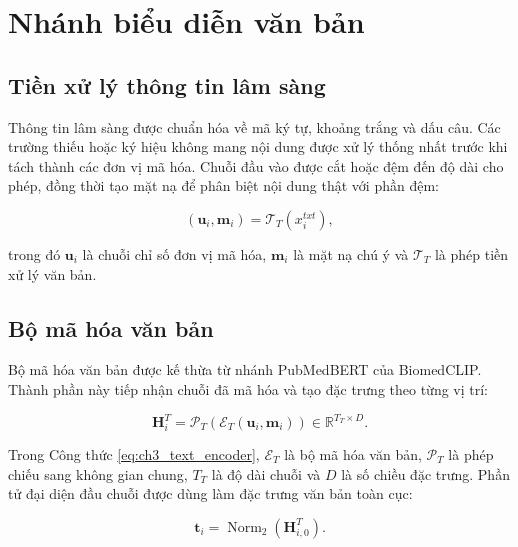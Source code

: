 \section{Nhánh biểu diễn văn bản}
\label{sec:ch3_text_branch}

\subsection{Tiền xử lý thông tin lâm sàng}
\label{subsec:ch3_text_preprocessing}

Thông tin lâm sàng được chuẩn hóa về mã ký tự, khoảng trắng và dấu câu. Các trường thiếu hoặc ký hiệu không mang nội dung được xử lý thống nhất trước khi tách thành các đơn vị mã hóa. Chuỗi đầu vào được cắt hoặc đệm đến độ dài cho phép, đồng thời tạo mặt nạ để phân biệt nội dung thật với phần đệm:

\begin{equation}
\left(
\boldsymbol{u}_{i},
\boldsymbol{m}_{i}
\right)
=
\mathcal{T}_{T}\left(x_i^{txt}\right),
\label{eq:ch3_text_preprocessing}
\end{equation}

trong đó $\boldsymbol{u}_{i}$ là chuỗi chỉ số đơn vị mã hóa, $\boldsymbol{m}_{i}$ là mặt nạ chú ý và $\mathcal{T}_{T}$ là phép tiền xử lý văn bản.

\subsection{Bộ mã hóa văn bản}
\label{subsec:ch3_text_encoder}

Bộ mã hóa văn bản được kế thừa từ nhánh PubMedBERT của BiomedCLIP. Thành phần này tiếp nhận chuỗi đã mã hóa và tạo đặc trưng theo từng vị trí:

\begin{equation}
\boldsymbol{H}_{i}^{T}
=
\mathcal{P}_{T}
\left(
\mathcal{E}_{T}
\left(
\boldsymbol{u}_{i},
\boldsymbol{m}_{i}
\right)
\right)
\in
\mathbb{R}^{T_T\times D}.
\label{eq:ch3_text_encoder}
\end{equation}

Trong Công thức \ref{eq:ch3_text_encoder}, $\mathcal{E}_{T}$ là bộ mã hóa văn bản, $\mathcal{P}_{T}$ là phép chiếu sang không gian chung, $T_T$ là độ dài chuỗi và $D$ là số chiều đặc trưng. Phần tử đại diện đầu chuỗi được dùng làm đặc trưng văn bản toàn cục:

\begin{equation}
\boldsymbol{t}_{i}
=
\operatorname{Norm}_{2}
\left(
\boldsymbol{H}_{i,0}^{T}
\right).
\label{eq:ch3_global_text}
\end{equation}


